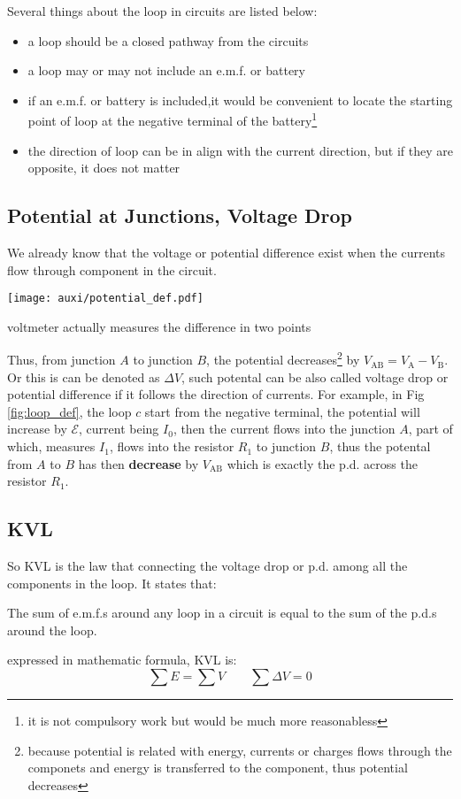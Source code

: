 \documentclass[a4paper]{tufte-handout}
\newenvironment{SummBox}
{\begin{tcolorbox}[breakable,colback=r1!30,colframe=r1,title=Summary]} {\end{tcolorbox}}
\begin{document}
Several things about the loop in circuits are listed below:
\begin{itemize}
  \item a loop should be a closed pathway from the circuits
  \item a loop may or may not include an e.m.f. or battery
  \item if an e.m.f. or battery is included,it would be convenient to locate the starting point of loop  at the negative terminal of the battery\footnote{it is not compulsory work but would be much more reasonabless}
  \item the direction of loop can be in align with the current direction, but if they are opposite, it does not matter
\end{itemize}

\subsection{Potential at Junctions, Voltage Drop}
We already know that the voltage or potential difference exist when the currents flow through component in the circuit.

\begin{marginfigure}
\texttt{[image: auxi/potential\_def.pdf]}
\caption{voltmeter actually measures the difference in two points}
\end{marginfigure}

Thus, from junction $A$ to junction $B$, the potential decreases\footnote{because potential is related with energy, currents or charges flows through the componets and energy is transferred to the component, thus potential decreases} by $V_{\text{AB}}=V_{\text{A}}-V_{\text{B}}$. Or this is can be denoted as $\Delta V$, such potental can be also called voltage drop or potential difference if it follows the direction of currents. For example, 
in Fig \ref{fig:loop_def}, the loop $c$ start from the negative terminal, the potential will increase by $\mathcal{E}$, current being $I_0$, then the current flows into the junction $A$, part of which, measures $I_1$, flows into the resistor $R_1$ to junction $B$, thus the potental from $A$ to $B$ has then \textbf{decrease} by $V_{\text{AB}}$ which is exactly the p.d. across the resistor $R_1$. 

\subsection{KVL}
So KVL is the law that connecting the voltage drop or p.d. among all the components in the loop. It states that:
\begin{SummBox}
The sum of e.m.f.s  around any loop in a circuit is equal to the sum of the p.d.s around the loop. 

expressed in mathematic formula, KVL is:
\[
  \sum E = \sum V \qquad \sum \Delta V = 0 
\]
\end{SummBox}
\end{document}
